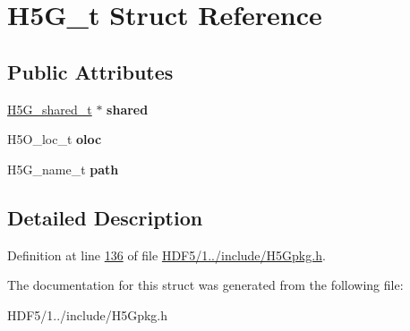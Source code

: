 \hypertarget{struct_h5_g__t}{}\section{H5\+G\+\_\+t Struct Reference}
\label{struct_h5_g__t}
\subsection*{Public Attributes}
\begin{DoxyCompactItemize}
\item 
\mbox{\label{struct_h5_g__t_a2be8f355b582e59fcb9df430538f9545}} 
\hyperlink{struct_h5_g__shared__t}{H5\+G\+\_\+shared\+\_\+t} $\ast$ {\bfseries shared}
\item 
\mbox{\label{struct_h5_g__t_af1d4b13a974e911a60e3b95a3e283653}} 
H5\+O\+\_\+loc\+\_\+t {\bfseries oloc}
\item 
\mbox{\label{struct_h5_g__t_a7ad93946fda27dbcaea105fbbc99cef2}} 
H5\+G\+\_\+name\+\_\+t {\bfseries path}
\end{DoxyCompactItemize}


\subsection{Detailed Description}


Definition at line \hyperlink{_h_d_f5_21_810_81_2include_2_h5_gpkg_8h_source_l00136}{136} of file \hyperlink{_h_d_f5_21_810_81_2include_2_h5_gpkg_8h_source}{H\+D\+F5/1../include/\+H5\+Gpkg.\+h}.



The documentation for this struct was generated from the following file\+:\begin{DoxyCompactItemize}
\item 
H\+D\+F5/1../include/\+H5\+Gpkg.\+h\end{DoxyCompactItemize}

